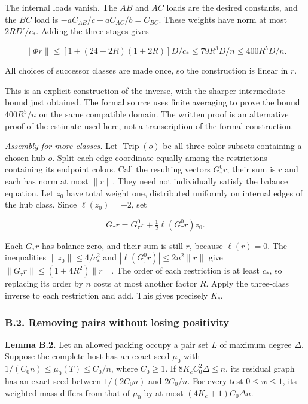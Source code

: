 \documentclass[english,11pt,a4paper]{article}
\begin{document}
The internal loads vanish. The \(AB\) and \(AC\) loads are the desired constants, and the \(BC\) load is \(-aC_{AB}/c-aC_{AC}/b=C_{BC}\). These weights have norm at most \(2RD'/c_\ast\). Adding the three stages gives

\[\|\Phi r\|\le[1+(24+2R)(1+2R)]D/c_\ast\le79R^3D/n\le400R^5D/n.\]

All choices of successor classes are made once, so the construction is linear in \(r\).

This is an explicit construction of the inverse, with the sharper intermediate bound just obtained. The formal source uses finite averaging to prove the bound \(400R^5/n\) on the same compatible domain. The written proof is an alternative proof of the estimate used here, not a transcription of the formal construction.

\emph{Assembly for more classes.} Let \(\operatorname{Trip}(o)\) be all three-color subsets containing a chosen hub \(o\). Split each edge coordinate equally among the restrictions containing its endpoint colors. Call the resulting vectors \(G^0_\tau r\); their sum is \(r\) and each has norm at most \(\|r\|\). They need not individually satisfy the balance equation. Let \(z_0\) have total weight one, distributed uniformly on internal edges of the hub class. Since \(\ell(z_0)=-2\), set

\[G_\tau r=G^0_\tau r+\tfrac12\ell(G^0_\tau r)z_0.\]

Each \(G_\tau r\) has balance zero, and their sum is still \(r\), because \(\ell(r)=0\). The inequalities \(\|z_0\|\le4/c_\ast^2\) and \(|\ell(G^0_\tau r)|\le2n^2\|r\|\) give \(\|G_\tau r\|\le(1+4R^2)\|r\|\). The order of each restriction is at least \(c_\ast\), so replacing its order by \(n\) costs at most another factor \(R\). Apply the three-class inverse to each restriction and add. This gives precisely \(K_c\).

\subsubsection{B.2. Removing pairs without losing positivity}\label{b.2.-removing-pairs-without-losing-positivity}

\textbf{Lemma B.2.} Let an allowed packing occupy a pair set \(L\) of maximum degree \(\Delta\). Suppose the complete host has an exact seed \(\mu_0\) with \(1/(C_0n)\le\mu_0(T)\le C_0/n\), where \(C_0\ge1\). If \(8K_cC_0^2\Delta\le n\), its residual graph has an exact seed between \(1/(2C_0n)\) and \(2C_0/n\). For every test \(0\le w\le1\), its weighted mass differs from that of \(\mu_0\) by at most \((4K_c+1)C_0\Delta n\).
\end{document}
